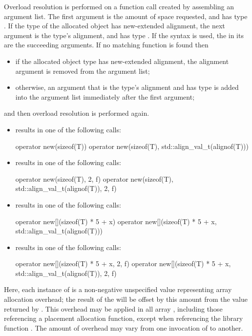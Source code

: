 \pnum
Overload resolution is
performed on a function call created by assembling an argument list.
The first argument is
the amount of space requested,
and has type .
If the type of the allocated object has new-extended alignment,
the next argument is
the type's alignment,
and has type .
If the  syntax is used,
the 
in its 
are the succeeding arguments.
If no matching function is found then
\begin{itemize}

\item
if the allocated object type has new-extended alignment,
the alignment argument is removed from the argument list;

\item
otherwise, an argument that
is the type's alignment and has type 
is added into the argument list immediately after the first argument;

\end{itemize}
and then overload resolution is performed again.

\pnum
\begin{example}
\begin{itemize}
\item {} results in one of the following calls:
\begin{codeblock}
operator new(sizeof(T))
operator new(sizeof(T), std::align_val_t(alignof(T)))
\end{codeblock}
\item {} results in one of the following calls:
\begin{codeblock}
operator new(sizeof(T), 2, f)
operator new(sizeof(T), std::align_val_t(alignof(T)), 2, f)
\end{codeblock}
\item {} results in one of the following calls:
\begin{codeblock}
operator new[](sizeof(T) * 5 + x)
operator new[](sizeof(T) * 5 + x, std::align_val_t(alignof(T)))
\end{codeblock}
\item {} results in one of the following calls:
\begin{codeblock}
operator new[](sizeof(T) * 5 + x, 2, f)
operator new[](sizeof(T) * 5 + x, std::align_val_t(alignof(T)), 2, f)
\end{codeblock}
\end{itemize}
Here, each instance of  is a non-negative unspecified value
representing array allocation overhead; the result of the
 will be offset by this amount from the value
returned by . This overhead may be applied in all
array , including those referencing
a placement allocation function, except when referencing
the library function .
The amount of overhead may vary from one
invocation of  to another.
\end{example}

